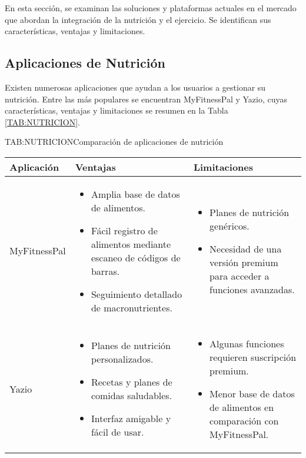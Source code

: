 En esta sección, se examinan las soluciones y plataformas actuales en el mercado que abordan la integración de la nutrición y el ejercicio. Se identifican sus características, ventajas y limitaciones.

\subsection{Aplicaciones de Nutrición}

Existen numerosas aplicaciones que ayudan a los usuarios a gestionar su nutrición. Entre las más populares se encuentran MyFitnessPal y Yazio, cuyas características, ventajas y limitaciones se resumen en la Tabla \ref{TAB:NUTRICION}.

\begin{table}[Comparación de aplicaciones de nutrición]{TAB:NUTRICION}{Comparación de aplicaciones de nutrición}
  \begin{tabular}{|p{3cm}|p{5cm}|p{5cm}|}
    \hline
    \textbf{Aplicación} & \textbf{Ventajas} & \textbf{Limitaciones} \\
    \hline
    MyFitnessPal & \begin{itemize}
      \item Amplia base de datos de alimentos.
      \item Fácil registro de alimentos mediante escaneo de códigos de barras.
      \item Seguimiento detallado de macronutrientes.
    \end{itemize} & \begin{itemize}
      \item Planes de nutrición genéricos.
      \item Necesidad de una versión premium para acceder a funciones avanzadas.
    \end{itemize} \\
    \hline
    Yazio & \begin{itemize}
      \item Planes de nutrición personalizados.
      \item Recetas y planes de comidas saludables.
      \item Interfaz amigable y fácil de usar.
    \end{itemize} & \begin{itemize}
      \item Algunas funciones requieren suscripción premium.
      \item Menor base de datos de alimentos en comparación con MyFitnessPal.
    \end{itemize} \\
    \hline
  \end{tabular}
\end{table}

